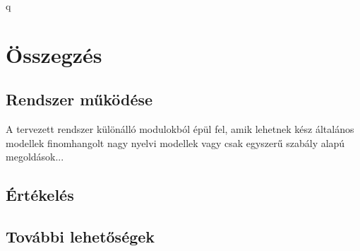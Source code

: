 q\chapter{Összegzés}

\section{Rendszer működése}

A tervezett rendszer különálló modulokból épül fel, amik lehetnek kész általános modellek finomhangolt nagy nyelvi modellek vagy csak egyszerű szabály alapú megoldások...

\section{Értékelés}

\section{További lehetőségek}

